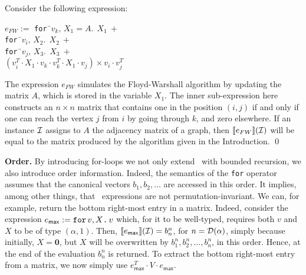 \begin{example}\label{ex:floyd}
Consider the following expression:
\begin{tabbing}
$e_{FW} := $ \texttt{for\,}\=$v_k,\, X_1\!=\!A.\ \ X_1 \ + $\\
\> \texttt{for\,}\=$v_i, \, X_2.\ \ X_2 \ +$ \\
\>\>\texttt{for\,}\=$v_j,\, X_3.\ \ X_3 \ +$ \\
\>\>\>$(v_i^T\cdot X_1\cdot v_k \cdot v_k^T\cdot X_1\cdot v_j)\times v_i\cdot v_j^T$
\end{tabbing}
The expression $e_{FW}$ simulates the Floyd-Warshall algorithm by updating the matrix $A$, which is stored in the variable $X_1$. The inner sub-expression here constructs an $n\times n$ matrix that contains one in the position $(i,j)$ if and only if one can reach the vertex $j$ from $i$ by going through $k$, and zero elsewhere. If an instance $\mathcal{I}$ assigns to $A$ the adjacency matrix of a graph, then $\llbracket e_{FW} \rrbracket(\mathcal{I})$ will be equal to the matrix produced by the algorithm given in the Introduction.
\qed
\end{example}


\noindent\textbf{Order.} 
By introducing for-loops we not only extend \lang\ with bounded recursion, we also introduce order information. Indeed, the semantics of the \texttt{for} operator assumes that the canonical vectors $b_1,b_2,\ldots$
are accessed in this order. It implies, among other things, that \langfor\ expressions are not permutation-invariant.
We can, for example, return the bottom right-most entry in a matrix. Indeed, consider the expression $e_{\mathsf{max}} := \texttt{for}\, v,X \texttt{.}\, v$ which, for it to be well-typed, requires both $v$ and $X$ to be of type $(\alpha,1)$. Then, $\llbracket e_{\mathsf{max}} \rrbracket(\mathcal{I})=b_n^n$, for $n=\mathcal{D}(\alpha)$, simply because initially, $X=\mathbf{0}$, but $X$ will be overwritten by $b_1^n,b_2^n,\ldots,b_n^n$, in this order. Hence, at the end of the evaluation $b_n^n$ is returned.
To extract the bottom right-most entry from a matrix, we now simply use $e_{\mathsf{max}}^T\cdot V\cdot e_{\mathsf{max}}$.


